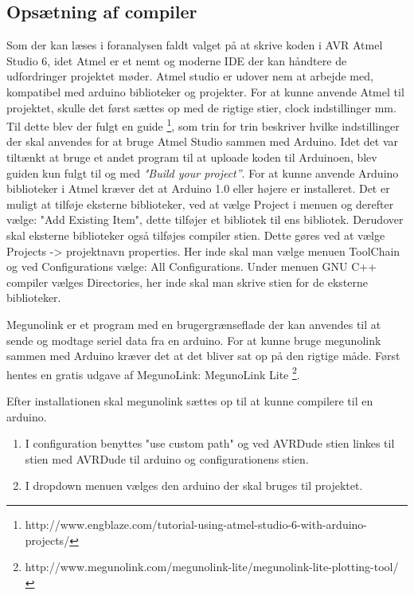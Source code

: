 \subsection{Opsætning af compiler}

Som der kan læses i foranalysen faldt valget på at skrive koden i AVR Atmel Studio 6, idet Atmel er et nemt og moderne IDE der kan håndtere de udfordringer projektet møder. Atmel studio er udover nem at arbejde med, kompatibel med arduino biblioteker og projekter.
For at kunne anvende Atmel til projektet, skulle det først sættes op med de rigtige stier, clock indstillinger mm. Til dette blev der fulgt en guide \footnote{http://www.engblaze.com/tutorial-using-atmel-studio-6-with-arduino-projects/}, som trin for trin beskriver hvilke indstillinger der skal anvendes for at bruge Atmel Studio sammen med Arduino. Idet det var tiltænkt at bruge et andet program til at uploade koden til Arduinoen, blev guiden kun fulgt til og med \textit{"Build your project”}. 
For at kunne anvende Arduino biblioteker i Atmel kræver det at Arduino 1.0 eller højere er installeret. Det er muligt at tilføje eksterne biblioteker, ved at vælge Project i menuen og derefter vælge: "Add Existing Item", dette tilføjer et bibliotek til ens bibliotek. Derudover skal eksterne biblioteker også tilføjes compiler stien. Dette gøres ved at vælge Projects -> projektnavn properties. Her inde skal man vælge menuen ToolChain og ved Configurations vælge: All Configurations. Under menuen GNU C++ compiler vælges Directories, her inde skal man skrive stien for de eksterne biblioteker.

Megunolink er et program med en brugergrænseflade der kan anvendes til at sende og modtage seriel data fra en arduino.
For at kunne bruge megunolink sammen med Arduino kræver det at det bliver sat op på den rigtige måde.
Først hentes en gratis udgave af MegunoLink: MegunoLink Lite \footnote{http://www.megunolink.com/megunolink-lite/megunolink-lite-plotting-tool/}.

Efter installationen skal megunolink sættes op til at kunne compilere til en arduino.

\begin{enumerate}
	\item I configuration benyttes "use custom path" og ved AVRDude stien linkes til stien med AVRDude til arduino og configurationens stien. 
	\item I dropdown menuen vælges den arduino der skal bruges til projektet.
\end{enumerate}

